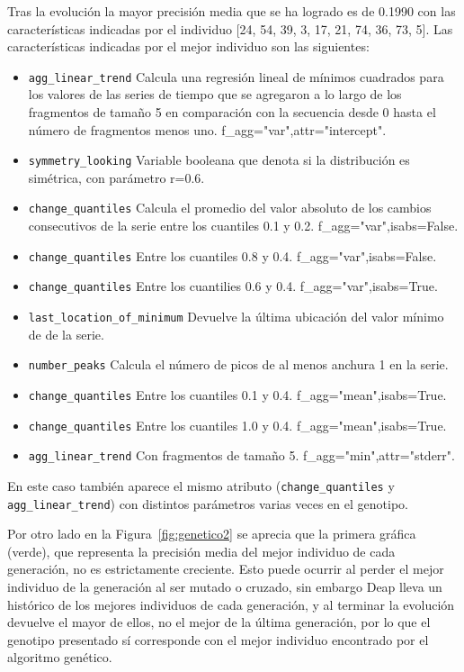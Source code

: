 \documentclass[a4paper,12pt,twoside,oldfontcommands]{memoir}
\begin{document}
Tras la evolución la mayor precisión media que se ha logrado es de 0.1990 con las características indicadas por el individuo [24, 54, 39, 3, 17, 21, 74, 36, 73, 5]. Las características indicadas por el mejor individuo son las siguientes:

\begin{itemize}

    \item \texttt{agg\_linear\_trend} Calcula una regresión lineal de mínimos cuadrados para los valores de las series de tiempo que se agregaron a lo largo de los fragmentos de tamaño 5 en comparación con la secuencia desde 0 hasta el número de fragmentos menos uno. f\_agg="var",attr="intercept".
    \item \texttt{symmetry\_looking} Variable booleana que denota si la distribución es simétrica, con parámetro r=0.6.
    \item \texttt{change\_quantiles} Calcula el promedio del valor absoluto de los cambios consecutivos de la serie entre los cuantiles 0.1 y 0.2. f\_agg="var",isabs=False.
    \item \texttt{change\_quantiles} Entre los cuantiles 0.8 y 0.4. f\_agg="var",isabs=False.
    \item \texttt{change\_quantiles} Entre los cuantilies 0.6 y 0.4. f\_agg="var",isabs=True.
    \item \texttt{last\_location\_of\_minimum} Devuelve la última ubicación del valor mínimo de de la serie.
    \item \texttt{number\_peaks} Calcula el número de picos de al menos anchura 1 en la serie.
    \item \texttt{change\_quantiles} Entre los cuantiles 0.1 y 0.4. f\_agg="mean",isabs=True.
    \item \texttt{change\_quantiles} Entre los cuantiles 1.0 y 0.4. f\_agg="mean",isabs=True.
    \item \texttt{agg\_linear\_trend} Con fragmentos de tamaño 5. f\_agg="min",attr="stderr".
\end{itemize}

En este caso también aparece el mismo atributo (\texttt{change\_quantiles} y \texttt{agg\_linear\_trend}) con distintos parámetros varias veces en el genotipo. 

Por otro lado en la Figura~\ref{fig:genetico2} se aprecia que la primera gráfica (verde), que representa la precisión media del mejor individuo de cada generación, no es estrictamente creciente. Esto puede ocurrir al perder el mejor individuo de la generación al ser mutado o cruzado, sin embargo Deap lleva un histórico de los mejores individuos de cada generación, y al terminar la evolución devuelve el mayor de ellos, no el mejor de la última generación, por lo que el genotipo presentado sí corresponde con el mejor individuo encontrado por el algoritmo genético. 
\end{document}
